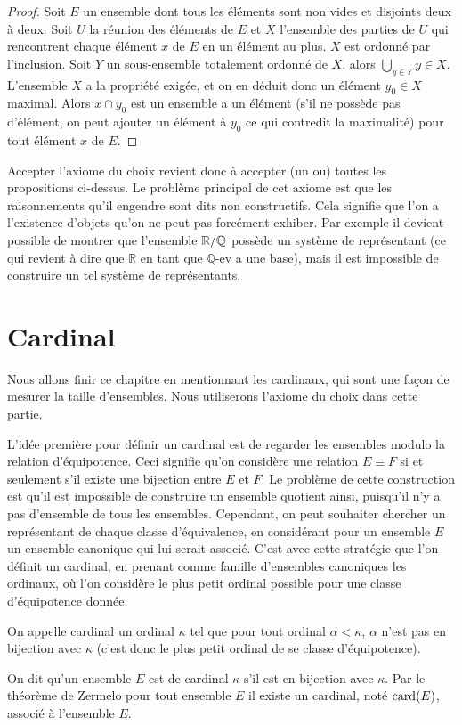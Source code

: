 \begin{proof}
    Soit $E$ un ensemble dont tous les éléments sont non vides et disjoints deux à deux. Soit $U$ la réunion des éléments de $E$ et $X$ l'ensemble des parties de $U$ qui rencontrent chaque élément $x$ de $E$ en un élément au plus. $X$ est ordonné par l'inclusion. Soit $Y$ un sous-ensemble totalement ordonné de $X$, alors $\bigcup_{y\in Y} y \in X$. L'ensemble $X$ a la propriété exigée, et on en déduit donc un élément $y_0 \in X$ maximal. Alors $x\cap y_0$ est un ensemble a un élément (s'il ne possède pas d'élément, on peut ajouter un élément à $y_0$ ce qui contredit la maximalité) pour tout élément $x$ de $E$.
\end{proof}

Accepter l'axiome du choix revient donc à accepter (un ou) toutes les propositions ci-dessus. Le problème principal de cet axiome est que les raisonnements qu'il engendre sont dits non constructifs. Cela signifie que l'on a l'existence d'objets qu'on ne peut pas forcément exhiber. Par exemple il devient possible de montrer que l'ensemble $\mathbb{R} / \mathbb Q$ possède un système de représentant (ce qui revient à dire que $\mathbb R$ en tant que $\mathbb Q$-ev a une base), mais il est impossible de construire un tel système de représentants.

\section{Cardinal}

Nous allons finir ce chapitre en mentionnant les cardinaux, qui sont une façon de mesurer la taille d'ensembles. Nous utiliserons l'axiome du choix dans cette partie.

L'idée première pour définir un cardinal est de regarder les ensembles modulo la relation d'équipotence. Ceci signifie qu'on considère une relation $E\equiv F$ si et seulement s'il existe une bijection entre $E$ et $F$. Le problème de cette construction est qu'il est impossible de construire un ensemble quotient ainsi, puisqu'il n'y a pas d'ensemble de tous les ensembles. Cependant, on peut souhaiter chercher un représentant de chaque classe d'équivalence, en considérant pour un ensemble $E$ un ensemble canonique qui lui serait associé. C'est avec cette stratégie que l'on définit un cardinal, en prenant comme famille d'ensembles canoniques les ordinaux, où l'on considère le plus petit ordinal possible pour une classe d'équipotence donnée.

\begin{defi}[Cardinal]
    On appelle cardinal un ordinal $\kappa$ tel que pour tout ordinal $\alpha < \kappa$, $\alpha$ n'est pas en bijection avec $\kappa$ (c'est donc le plus petit ordinal de se classe d'équipotence).

    On dit qu'un ensemble $E$ est de cardinal $\kappa$ s'il est en bijection avec $\kappa$. Par le théorème de Zermelo pour tout ensemble $E$ il existe un cardinal, noté $\mathrm{card}(E)$, associé à l'ensemble $E$.
\end{defi}

